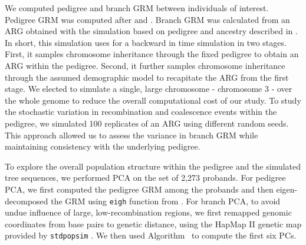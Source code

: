 \begin{table}
  \centering
  \caption{Selected regions and parishes from the BALSAC French-Canadian Pedigree}
  \renewcommand{\arraystretch}{1.2}
  \label{tab:parishes}
\end{table}

We computed pedigree and branch GRM between individuals of interest.
%
Pedigree GRM was computed after
\citet{lange1992calculation} and \citet{colleau2002indirect}.
%
Branch GRM was calculated from an ARG
obtained with the simulation based on pedigree and ancestry
described in \citet{andersontrocme2023genes}.
%
In short, this simulation uses \msprime{} \citep{baumdicker2022efficient} 
for a backward in time simulation in two stages.
%
First, it samples chromosome inheritance through the fixed pedigree
to obtain an ARG within the pedigree.
%
Second, it further samples chromosome inheritance through the assumed demographic model
to recapitate the ARG from the first stage.
%
We elected to simulate a single, large chromosome - chromosome 3 - over the whole genome to reduce the overall computational cost of our study.
%
To study the stochastic variation in recombination and coalescence events within the pedigree,
we simulated 100 replicates of an ARG using different random seeds.
%
This approach allowed us to assess the variance in branch GRM
while maintaining consistency with the underlying pedigree.

To explore the overall population structure within the pedigree and the simulated tree sequences,
we performed PCA on the set of 2,273 probands.
%
For pedigree PCA, we first computed the pedigree GRM
among the probands and then eigen-decomposed the GRM using
\texttt{eigh} function from \scipy{} \citep{Virtanen2020SciPy}.
%
For branch PCA, to avoid undue influence of large, low-recombination regions,
we first remapped genomic coordinates from base pairs to genetic distance,
using the HapMap II genetic map provided by \texttt{stdpopsim} \citep{adrion2020stdpopsim}.
%
We then used Algorithm~ to compute the first six PCs.

